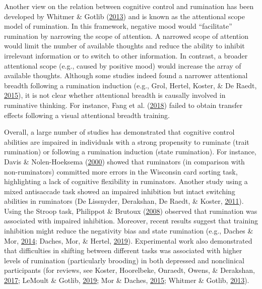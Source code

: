 \documentclass[a4paper,12pt,twoside,onecolumn,openright,final,oldfontcommands]{memoir}
\begin{document}
Another view on the relation between cognitive control and rumination has been developed by Whitmer \& Gotlib (\protect\hyperlink{ref-Whitmer2013}{2013}) and is known as the attentional scope model of rumination. In this framework, negative mood would \enquote{facilitate} rumination by narrowing the scope of attention. A narrowed scope of attention would limit the number of available thoughts and reduce the ability to inhibit irrelevant information or to switch to other information. In contrast, a broader attentional scope (e.g., caused by positive mood) would increase the array of available thoughts. Although some studies indeed found a narrower attentional breadth following a rumination induction (e.g., Grol, Hertel, Koster, \& De Raedt, \protect\hyperlink{ref-grol_effects_2015}{2015}), it is not clear whether attentional breadth is causally involved in ruminative thinking. For instance, Fang et al. (\protect\hyperlink{ref-fang_can_2018}{2018}) failed to obtain transfer effects following a visual attentional breadth training.

Overall, a large number of studies has demonstrated that cognitive control abilities are impaired in individuals with a strong propensity to ruminate (trait rumination) or following a rumination induction (state rumination). For instance, Davis \& Nolen-Hoeksema (\protect\hyperlink{ref-Davis2000}{2000}) showed that ruminators (in comparison with non-ruminators) committed more errors in the Wisconsin card sorting task, highlighting a lack of cognitive flexibility in ruminators. Another study using a mixed antisaccade task showed an impaired inhibition but intact switching abilities in ruminators (De Lissnyder, Derakshan, De Raedt, \& Koster, \protect\hyperlink{ref-DeLissnyder2011}{2011}). Using the Stroop task, Philippot \& Brutoux (\protect\hyperlink{ref-Philippot2008}{2008}) observed that rumination was associated with impaired inhibition. Moreover, recent results suggest that training inhibition might reduce the negativity bias and state rumination (e.g., Daches \& Mor, \protect\hyperlink{ref-daches_training_2014}{2014}; Daches, Mor, \& Hertel, \protect\hyperlink{ref-daches_training_2019}{2019}). Experimental work also demonstrated that difficulties in shifting between different tasks was associated with higher levels of rumination (particularly brooding) in both depressed and nonclinical participants (for reviews, see Koster, Hoorelbeke, Onraedt, Owens, \& Derakshan, \protect\hyperlink{ref-koster_cognitive_2017}{2017}; LeMoult \& Gotlib, \protect\hyperlink{ref-lemoult_depression_2019}{2019}; Mor \& Daches, \protect\hyperlink{ref-mor_ruminative_2015}{2015}; Whitmer \& Gotlib, \protect\hyperlink{ref-Whitmer2013}{2013}).
\end{document}
